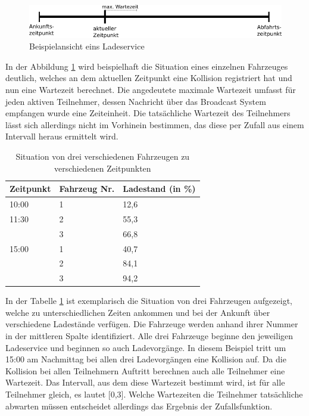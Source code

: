 \begin{figure}[htb]
	\includegraphics[width = \linewidth]{img/SA_participants_Graph2.png}
	\caption{Beispielansicht eins Ladeservice}
	\label{SAPart:Graph}
\end{figure}
In der Abbildung \ref{SAPart:Graph} wird beispielhaft die Situation eines einzelnen Fahrzeuges deutlich, welches an dem aktuellen Zeitpunkt eine Kollision registriert hat und nun eine Wartezeit berechnet. Die angedeutete maximale Wartezeit umfasst für jeden aktiven Teilnehmer, dessen Nachricht über das Broadcast System empfangen wurde eine Zeiteinheit. Die tatsächliche Wartezeit des Teilnehmers lässt sich allerdings nicht im Vorhinein bestimmen, das diese per Zufall aus einem Intervall heraus ermittelt wird.
\begin{table}[htb]
\centering
\begin{tabular}{|l|l|l|}
\hline
Zeitpunkt & Fahrzeug Nr. & Ladestand (in \%) \\ \hline \hline
10:00     & 1            & 12,6      \\ \hline
11:30     & 2            & 55,3      \\ \hline
          & 3            & 66,8      \\ \hline
15:00     & 1            & 40,7      \\ \hline
          & 2            & 84,1      \\ \hline
          & 3            & 94,2      \\ \hline
\end{tabular}
\caption{Situation von drei verschiedenen Fahrzeugen zu verschiedenen Zeitpunkten}
\label{tab:example1}
\end{table}


In der Tabelle \ref{tab:example1} ist exemplarisch die Situation von drei Fahrzeugen aufgezeigt, welche zu unterschiedlichen Zeiten ankommen und bei der Ankunft über verschiedene Ladestände verfügen. Die Fahrzeuge werden anhand ihrer Nummer in der mittleren Spalte identifiziert. Alle drei Fahrzeuge beginne den jeweiligen Ladeservice und beginnen so auch Ladevorgänge. In diesem Beispiel tritt um 15:00 am Nachmittag bei allen drei Ladevorgängen eine Kollision auf. Da die Kollision bei allen Teilnehmern Auftritt berechnen auch alle Teilnehmer eine Wartezeit. Das Intervall, aus dem diese Wartezeit bestimmt wird, ist für alle Teilnehmer gleich, es lautet [0,3]. Welche Wartezeiten die Teilnehmer tatsächliche abwarten müssen entscheidet allerdings das Ergebnis der Zufallsfunktion.

